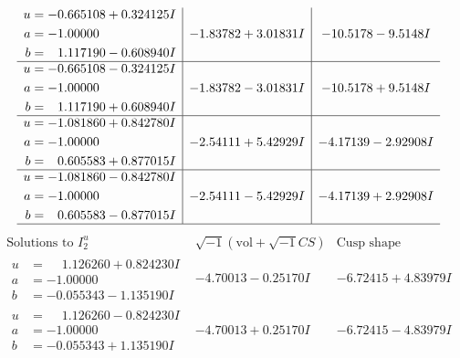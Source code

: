 \documentclass[1p]{elsarticle_modified}
\theoremstyle{definition}
\newcommand{\I}{\sqrt{-1}}
\begin{document}
$$\begin{array}{c|c|c}
\begin{aligned}
u &= -0.665108 + 0.324125 I \\
a &= -1.00000\phantom{ +0.000000I} \\
b &= \phantom{-}1.117190 - 0.608940 I\end{aligned}
 & -1.83782 + 3.01831 I & -10.5178 - 9.5148 I \\ \hline\begin{aligned}
u &= -0.665108 - 0.324125 I \\
a &= -1.00000\phantom{ +0.000000I} \\
b &= \phantom{-}1.117190 + 0.608940 I\end{aligned}
 & -1.83782 - 3.01831 I & -10.5178 + 9.5148 I \\ \hline\begin{aligned}
u &= -1.081860 + 0.842780 I \\
a &= -1.00000\phantom{ +0.000000I} \\
b &= \phantom{-}0.605583 + 0.877015 I\end{aligned}
 & -2.54111 + 5.42929 I & -4.17139 - 2.92908 I \\ \hline\begin{aligned}
u &= -1.081860 - 0.842780 I \\
a &= -1.00000\phantom{ +0.000000I} \\
b &= \phantom{-}0.605583 - 0.877015 I\end{aligned}
 & -2.54111 - 5.42929 I & -4.17139 + 2.92908 I\\
 \hline 
 \end{array}$$\newpage$$\begin{array}{c|c|c}  
\text{Solutions to }I^u_{2}& \I (\text{vol} + \sqrt{-1}CS) & \text{Cusp shape}\\
 \hline 
\begin{aligned}
u &= \phantom{-}1.126260 + 0.824230 I \\
a &= -1.00000\phantom{ +0.000000I} \\
b &= -0.055343 - 1.135190 I\end{aligned}
 & -4.70013 - 0.25170 I & -6.72415 + 4.83979 I \\ \hline\begin{aligned}
u &= \phantom{-}1.126260 - 0.824230 I \\
a &= -1.00000\phantom{ +0.000000I} \\
b &= -0.055343 + 1.135190 I\end{aligned}
 & -4.70013 + 0.25170 I & -6.72415 - 4.83979 I \\ \hline\begin{aligned}

\end{aligned}
\end{array}$$
\end{document}
